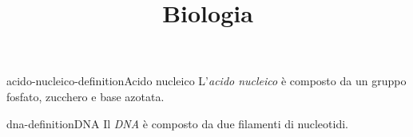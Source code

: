 \documentclass[preview]{standalone}
\begin{document}
\title{Biologia}
\genpage


\begin{snippetdefinition}{acido-nucleico-definition}{Acido nucleico}
    L'\textit{acido nucleico} è composto da un gruppo fosfato, zucchero e base azotata.
\end{snippetdefinition}

\begin{snippetdefinition}{dna-definition}{DNA}
    Il \textit{DNA} è composto da due filamenti di nucleotidi.
\end{snippetdefinition}

\end{document}
